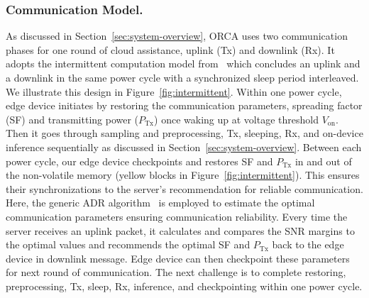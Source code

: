 \subsubsection{Communication Model.} 
As discussed in Section~\ref{sec:system-overview}, ORCA uses two communication phases for one round of cloud assistance, uplink (Tx) and downlink (Rx). It adopts the intermittent computation model from~\cite{mileiko2023run} which concludes an uplink and a downlink in the same power cycle with a synchronized sleep period interleaved.  We illustrate this design in Figure~\ref{fig:intermittent}. Within one power cycle, edge device initiates by restoring the communication parameters, spreading factor (SF) and transmitting power ($P_{\text{Tx}}$) once waking up at voltage threshold $V_{\text{on}}$. Then it goes through sampling and preprocessing, Tx, sleeping, Rx, and on-device inference sequentially as discussed in Section~\ref{sec:system-overview}. Between each power cycle, our edge device checkpoints and restores SF and $P_{\text{Tx}}$ in and out of the non-volatile memory (yellow blocks in Figure~\ref{fig:intermittent}). This ensures their synchronizations to the server's recommendation for reliable communication. Here, the generic ADR algorithm~\cite{Semtech2016LoRaWAN} is employed to estimate the optimal communication parameters ensuring communication reliability. Every time the server receives an uplink packet, it calculates and compares the SNR margins to the optimal values and recommends the optimal SF and $P_{\text{Tx}}$ back to the edge device in downlink message. Edge device can then checkpoint these parameters for next round of communication. The next challenge is to complete restoring, preprocessing, Tx, sleep, Rx, inference, and checkpointing within one power cycle.




